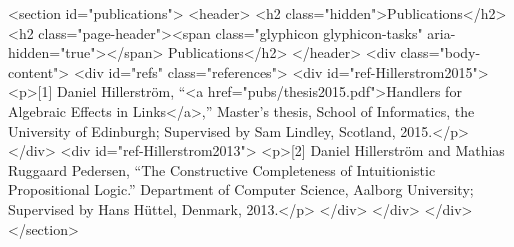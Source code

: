       <section id="publications">
	<header>
	  <h2 class="hidden">Publications</h2>
	  <h2 class="page-header"><span class="glyphicon glyphicon-tasks" aria-hidden="true"></span> Publications</h2>
	</header>
	<div class="body-content">
	  <div id="refs" class="references">
<div id="ref-Hillerstrom2015">
<p>[1] Daniel Hillerström, “<a href="pubs/thesis2015.pdf">Handlers for Algebraic Effects in Links</a>,” Master’s thesis, School of Informatics, the University of Edinburgh; Supervised by Sam Lindley, Scotland, 2015.</p>
</div>
<div id="ref-Hillerstrom2013">
<p>[2] Daniel Hillerström and Mathias Ruggaard Pedersen, “The Constructive Completeness of Intuitionistic Propositional Logic.” Department of Computer Science, Aalborg University; Supervised by Hans Hüttel, Denmark, 2013.</p>
</div>
</div>
	</div>
      </section>
